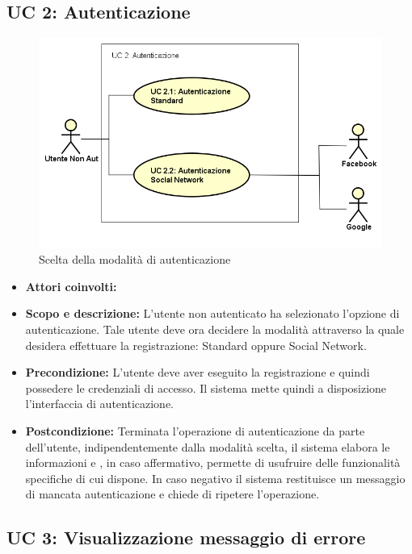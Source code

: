 \subsection{UC 2: Autenticazione}
	\begin{figure}[h]
		\centering
		\includegraphics[scale=0.6]{../../Casi D'uso/UC2.png}
		\caption{Scelta della modalità di autenticazione}
	\end{figure}
	\begin{itemize}
		\item \textbf{Attori coinvolti:}
		\item \textbf{Scopo e descrizione:} L'utente non autenticato ha selezionato l'opzione di autenticazione. Tale utente deve ora decidere la modalità attraverso la quale desidera effettuare la registrazione: Standard oppure Social Network. \\
		\item \textbf{Precondizione:} L'utente deve aver eseguito la registrazione e quindi possedere le credenziali di accesso. Il sistema mette quindi a disposizione l'interfaccia di autenticazione. \\
		\item \textbf{Postcondizione:} Terminata l'operazione di autenticazione da parte dell'utente, indipendentemente dalla modalità scelta, il sistema elabora le informazioni e , in caso affermativo, permette di usufruire delle funzionalità specifiche di cui dispone. In caso negativo il sistema restituisce un messaggio di mancata autenticazione e chiede di ripetere l'operazione. \\
	\end{itemize}
\subsection{UC 3: Visualizzazione messaggio di errore}